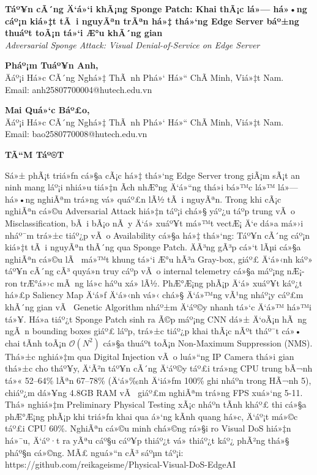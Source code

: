 \documentclass[]{article}
\author{}
\date{}
\begin{document}
\textbf{Táº¥n cÃ´ng Ä‘á»‘i khÃ¡ng Sponge Patch: Khai thÃ¡c lá»— há»•ng cáº¡n kiá»‡t tÃ i
nguyÃªn trÃªn há»‡ thá»‘ng Edge Server báº±ng thuáº­t toÃ¡n tá»‘i Æ°u khÃ´ng gian}\\
\emph{Adversarial Sponge Attack: Visual Denial-of-Service on Edge
Server}

\textbf{Pháº¡m Tuáº¥n Anh,}\\
Äáº¡i Há»c CÃ´ng Nghá»‡ ThÃ nh Phá»‘ Há»“ ChÃ­ Minh, Viá»‡t Nam.\\
Email: anh25807700004@hutech.edu.vn

\textbf{Mai Quá»‘c Báº£o,}\\
Äáº¡i Há»c CÃ´ng Nghá»‡ ThÃ nh Phá»‘ Há»“ ChÃ­ Minh, Viá»‡t Nam.\\
Email: bao2580770008@hutech.edu.vn

\textbf{TÃ“M Táº®T}

Sá»± phÃ¡t triá»ƒn cá»§a cÃ¡c há»‡ thá»‘ng Edge Server trong giÃ¡m sÃ¡t an ninh mang
láº¡i nhiá»u tiá»‡n Ã­ch nhÆ°ng Ä‘á»“ng thá»i bá»™c lá»™ lá»— há»•ng nghiÃªm trá»ng vá» quáº£n
lÃ½ tÃ i nguyÃªn. Trong khi cÃ¡c nghiÃªn cá»©u Adversarial Attack hiá»‡n táº¡i chá»§
yáº¿u táº­p trung vÃ o Misclassification, bÃ i bÃ¡o nÃ y Ä‘á» xuáº¥t má»™t vectÆ¡ Ä‘e dá»a 
má»›i nháº¯m trá»±c tiáº¿p vÃ o Availability cá»§a há»‡ thá»‘ng: Táº¥n cÃ´ng cáº¡n kiá»‡t tÃ i 
nguyÃªn thÃ´ng qua Sponge Patch. ÄÃ³ng gÃ³p cá»‘t lÃµi cá»§a nghiÃªn cá»©u lÃ  má»™t 
khung tá»‘i Æ°u hÃ³a Gray-box, giáº£ Ä‘á»‹nh káº» táº¥n cÃ´ng cÃ³ quyá»n truy cáº­p vÃ o 
internal telemetry cá»§a máº¡ng nÆ¡-ron trÆ°á»›c mÃ ng lá»c háº­u xá»­ lÃ½. PhÆ°Æ¡ng phÃ¡p 
Ä‘á» xuáº¥t káº¿t há»£p Saliency Map Ä‘á»ƒ Ä‘á»‹nh vá»‹ chá»§ Ä‘á»™ng vÃ¹ng nháº¡y cáº£m khÃ´ng gian 
vÃ  Genetic Algorithm nháº±m Ä‘áº©y nhanh tá»‘c Ä‘á»™ há»™i tá»¥. Há»a tiáº¿t Sponge Patch 
sinh ra Ã©p máº¡ng CNN dá»± Ä‘oÃ¡n hÃ ng ngÃ n bounding boxes giáº£ láº­p, trá»±c tiáº¿p 
khai thÃ¡c nÃºt tháº¯t cá»• chai tÃ­nh toÃ¡n \(\mathcal{O}\left( N^{2} \right)\) 
cá»§a thuáº­t toÃ¡n Non-Maximum Suppression (NMS). Thá»±c nghiá»‡m qua Digital 
Injection vÃ o luá»“ng IP Camera thá»i gian thá»±c cho tháº¥y, Ä‘Ã²n táº¥n cÃ´ng Ä‘áº©y 
táº£i trá»ng CPU trung bÃ¬nh tá»« 52--64\% lÃªn 67--78\% (Ä‘á»‰nh Ä‘iá»ƒm 100\% ghi 
nháº­n trong HÃ¬nh 5), chiáº¿m dá»¥ng 4.8GB RAM vÃ  giáº£m nghiÃªm trá»ng FPS xuá»‘ng 
5-11. Thá»­ nghiá»‡m Preliminary Physical Testing xÃ¡c nháº­n tÃ­nh kháº£ thi cá»§a 
phÆ°Æ¡ng phÃ¡p khi triá»ƒn khai qua á»‘ng kÃ­nh quang há»c, Ä‘áº¡t má»©c táº£i CPU 60\%. 
NghiÃªn cá»©u minh chá»©ng rá»§i ro Visual DoS hiá»‡n há»¯u, Ä‘áº·t ra yÃªu cáº§u cáº¥p thiáº¿t 
vá» thiáº¿t káº¿ phÃ²ng thá»§ pháº§n cá»©ng. MÃ£ nguá»“n cÃ³ sáºµn táº¡i:
https://github.com/reikageisme/Physical-Visual-DoS-EdgeAI
\end{document}
